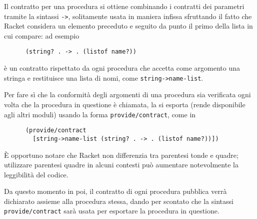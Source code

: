 Il contratto per una procedura si ottiene combinando i contratti dei
parametri tramite la sintassi \lstinline{->}, solitamente usata in maniera
infissa sfruttando il fatto che Racket considera un elemento preceduto e
seguito da punto il primo della lista in cui compare: ad esempio

\begin{lstlisting}
      (string? . -> . (listof name?))
\end{lstlisting}

\`e un contratto rispettato da ogni procedura che accetta come argomento una
stringa e restituisce una lista di nomi, come \lstinline{string->name-list}.

Per fare s\`i che la conformit\`a degli argomenti di una procedura sia
verificata ogni volta che la procedura in questione \`e chiamata, la si
esporta (rende disponibile agli altri moduli) usando la forma
\lstinline{provide/contract}, come in

\begin{lstlisting}
      (provide/contract
        [string->name-list (string? . -> . (listof name?))])
\end{lstlisting}

\`E opportuno notare che Racket non differenzia tra parentesi tonde e quadre;
utilizzare parentesi quadre in alcuni contesti pu\`o aumentare notevolmente
la leggibilit\`a del codice.

Da questo momento in poi, il contratto di ogni procedura pubblica verr\`a
dichiarato assieme alla procedura stessa, dando per scontato che la
sintassi \lstinline{provide/contract} sar\`a usata per esportare la
procedura in questione.
